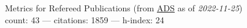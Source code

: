 Metrics for Refereed Publications (from \href{\adsurl}{ADS} as of \textit{2022-11-25}) \\count: 43 --- citations: 1859 --- h-index: 24